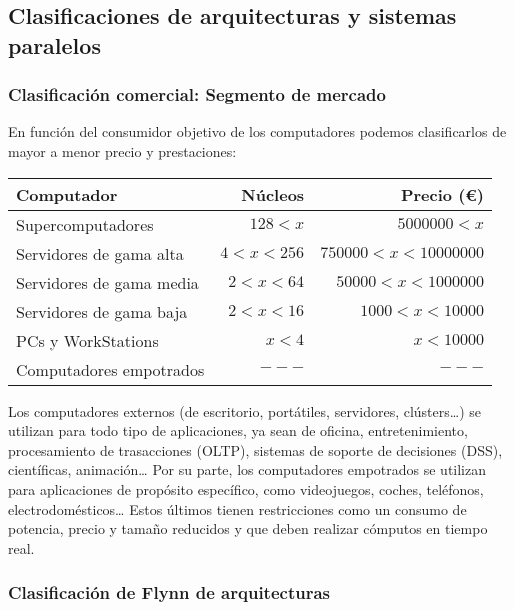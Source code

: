 \subsection{Clasificaciones de arquitecturas y sistemas paralelos}\label{clasificaciones-arq-sistemas-paralelos}

\subsubsection{Clasificación comercial: Segmento de mercado}

En función del consumidor objetivo de los computadores podemos clasificarlos de mayor a menor precio y prestaciones:

\begin{center}
\begin{tabular}{l r r}
\textbf{Computador}       & \textbf{Núcleos} & \textbf{Precio (€)} \\
\toprule
Supercomputadores         & $128<x$          & $5000000<x$         \\
Servidores de gama alta   & $4<x<256$        & $750000<x<10000000$ \\
Servidores de gama media  & $2<x<64$         & $50000<x<1000000$   \\
Servidores de gama baja   & $2<x<16$         & $1000<x<10000$      \\
PCs y WorkStations        & $x<4$            & $x<10000$           \\
Computadores empotrados   & $---$            & $---$               \\
\end{tabular}
\end{center}

Los computadores externos (de escritorio, portátiles, servidores, clústers\ldots) se utilizan para todo tipo de aplicaciones, ya sean de oficina, entretenimiento, procesamiento de trasacciones (OLTP), sistemas de soporte de decisiones (DSS), científicas, animación\ldots
Por su parte, los computadores empotrados se utilizan para aplicaciones de propósito específico, como videojuegos, coches, teléfonos, electrodomésticos\ldots
Estos últimos tienen restricciones como un consumo de potencia, precio y tamaño reducidos y que deben realizar cómputos en tiempo real.

\subsubsection{Clasificación de Flynn de arquitecturas}

